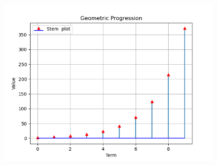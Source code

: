 \documentclass[a4,12pt,onecolumn]{IEEEtran}
\begin{document}
\begin{figure}[ht!]
\includegraphics[width=\columnwidth]{fig/fig2.png}
\caption{}
\label{}
\end{figure}
\end{document}
